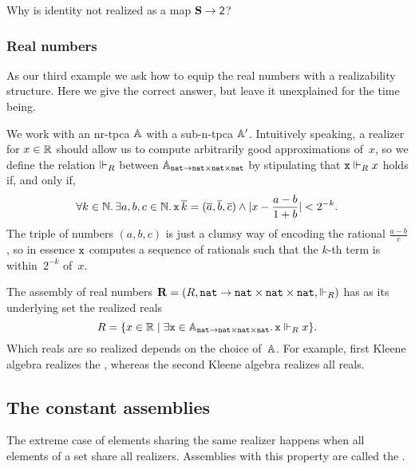 \begin{exercise}
  Why is identity not realized as a map $\asm{S} \to \two$?
\end{exercise}


\subsubsection{Real numbers}
\label{sec:asm-real-numbers}

As our third example we ask how to equip the real numbers with a realizability structure. Here we give the correct answer, but leave it unexplained for the time being.

We work with an nr-tpca $\AA$ with a sub-n-tpca $\subAA$. Intuitively speaking, a realizer for $x \in \RR$ should allow us to compute arbitrarily good approximations of~$x$, so we define the relation $\rz_R$ between $\Atyp{\ttnat \to \ttnat \times \ttnat \times \ttnat}$ by stipulating that $\R{x} \rz_R x$ holds if, and only if,
%
\begin{equation*}
  \all{k \in \NN} \some{a, b, c \in \NN}
  \R{x} \, \overline{k} = (\overline{a}, \overline{b}, \overline{c})
  \land |x - \frac{a - b}{1 + b}| < 2^{-k}.
\end{equation*}
%
The triple of numbers $(a, b, c)$ is just a clumsy way of encoding the rational $\frac{a - b}{c}$, so in essence $\R{x}$ computes a sequence of rationals such that the $k$-th term is within~$2^{-k}$ of~$x$.

The assembly of real numbers $\asm{R} = (R, \ttnat \to \ttnat \times \ttnat \times \ttnat, {\rz_R})$ has as its underlying set the realized reals
%
\begin{equation*}
  R = \set{x \in \RR \such \some{\R{x} \in \Atyp{\ttnat \to \ttnat \times \ttnat \times \ttnat}} \R{x} \rz_R x}.
\end{equation*}
%
Which reals are so realized depends on the choice of~$\AA$. For example, first Kleene algebra realizes the , whereas the second Kleene algebra realizes all reals.

\subsection{The constant assemblies}
\label{sec:nabla}

The extreme case of elements sharing the same realizer happens when
all elements of a set share all realizers. Assemblies with this
property are called the .

